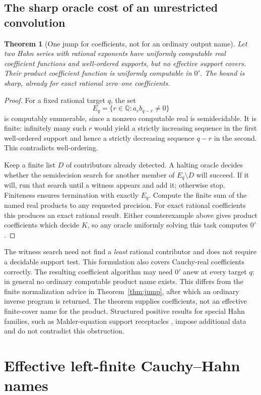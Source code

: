 \documentclass[11pt,letterpaper]{article}
\numberwithin{equation}{section}
\newtheorem{theorem}{Theorem}[section]
\theoremstyle{definition}
\theoremstyle{remark}
\newcommand{\Q}{\mathbb Q}
\begin{document}
\subsection{The sharp oracle cost of an unrestricted convolution}
\begin{theorem}[One jump for coefficients, not for an ordinary output name]
\label{thm:convolution-jump}
Let two Hahn series with rational exponents have uniformly computable real
coefficient functions and well-ordered supports, but no effective support
covers. Their product coefficient function is uniformly computable in $0'$.
The bound is sharp, already for exact rational zero--one coefficients.
\end{theorem}
\begin{proof}
For a fixed rational target $q$, the set
\[
 E_q=\{r\in\Q:a_r b_{q-r}\ne0\}
\]
is computably enumerable, since a nonzero computable real is semidecidable.
It is finite: infinitely many such $r$ would yield a strictly increasing
sequence in the first well-ordered support and hence a strictly decreasing
sequence $q-r$ in the second. This contradicts well-ordering.

Keep a finite list $D$ of contributors already detected. A halting oracle
decides whether the semidecision search for another member of $E_q\setminus D$
will succeed. If it will, run that search until a witness appears and add it;
otherwise stop. Finiteness ensures termination with exactly $E_q$.
Compute the finite sum of the named real products to any requested precision.
For exact rational coefficients this produces an exact rational result.
Either counterexample above gives product coefficients which decide $K$,
so any oracle uniformly solving this task computes $0'$.
\end{proof}
The witness search need not find a \emph{least} rational contributor and does
not require a decidable support test. This formulation also covers
Cauchy-real coefficients correctly. The resulting coefficient algorithm may
need $0'$ anew at every target $q$; in general no ordinary computable product
name exists. This differs from the finite normalization advice in
Theorem~\ref{thm:jump}, after which an ordinary inverse program is returned.
The theorem supplies coefficients, not an effective finite-cover name for
the product. Structured positive results for special Hahn families, such as
Mahler-equation support receptacles \cite{faverjon}, impose additional data
and do not contradict this obstruction.

\section{Effective left-finite Cauchy--Hahn names}
\label{sec:definition}
\end{document}
